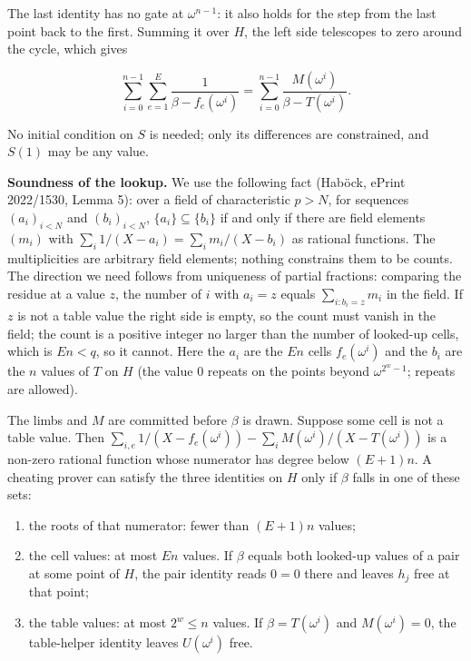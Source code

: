 The last identity has no gate at \(\omega^{n-1}\): it also holds for the step from the last point back to the first. Summing it over \(H\), the left side telescopes to zero around the cycle, which gives

\[\sum_{i=0}^{n-1} \sum_{e=1}^{E} \frac{1}{\beta - f_e(\omega^i)} = \sum_{i=0}^{n-1} \frac{M(\omega^i)}{\beta - T(\omega^i)}.\]

No initial condition on \(S\) is needed; only its differences are constrained, and \(S(1)\) may be any value.

\textbf{Soundness of the lookup.} We use the following fact (Haböck, ePrint 2022/1530, Lemma 5): over a field of characteristic \(p > N\), for sequences \((a_i)_{i<N}\) and \((b_i)_{i<N}\), \(\{a_i\} \subseteq \{b_i\}\) if and only if there are field elements \((m_i)\) with \(\sum_i 1/(X - a_i) = \sum_i m_i/(X - b_i)\) as rational functions. The multiplicities are arbitrary field elements; nothing constrains them to be counts. The direction we need follows from uniqueness of partial fractions: comparing the residue at a value \(z\), the number of \(i\) with \(a_i = z\) equals \(\sum_{i: b_i = z} m_i\) in the field. If \(z\) is not a table value the right side is empty, so the count must vanish in the field; the count is a positive integer no larger than the number of looked-up cells, which is \(En < q\), so it cannot. Here the \(a_i\) are the \(En\) cells \(f_e(\omega^i)\) and the \(b_i\) are the \(n\) values of \(T\) on \(H\) (the value 0 repeats on the points beyond \(\omega^{2^w-1}\); repeats are allowed).

The limbs and \(M\) are committed before \(\beta\) is drawn. Suppose some cell is not a table value. Then \(\sum_{i,e} 1/(X - f_e(\omega^i)) - \sum_i M(\omega^i)/(X - T(\omega^i))\) is a non-zero rational function whose numerator has degree below \((E+1)n\). A cheating prover can satisfy the three identities on \(H\) only if \(\beta\) falls in one of these sets:

\begin{enumerate}
\def\labelenumi{\arabic{enumi}.}
\item
  the roots of that numerator: fewer than \((E+1)n\) values;
\item
  the cell values: at most \(En\) values. If \(\beta\) equals both looked-up values of a pair at some point of \(H\), the pair identity reads \(0 = 0\) there and leaves \(h_j\) free at that point;
\item
  the table values: at most \(2^w \le n\) values. If \(\beta = T(\omega^i)\) and \(M(\omega^i) = 0\), the table-helper identity leaves \(U(\omega^i)\) free.
\end{enumerate}

